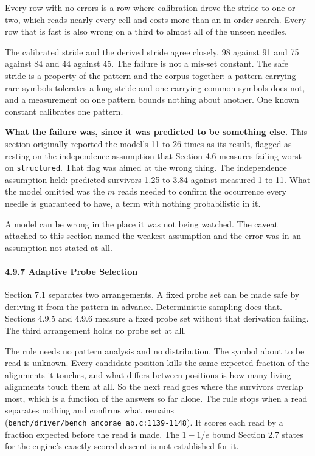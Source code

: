 Every row with no errors is a row where calibration drove the stride to one or two, which reads nearly every cell and costs more than an in-order search. Every row that is fast is also wrong on a third to almost all of the unseen needles.

The calibrated stride and the derived stride agree closely, 98 against 91 and 75 against 84 and 44 against 45. The failure is not a mis-set constant. The safe stride is a property of the pattern and the corpus together: a pattern carrying rare symbols tolerates a long stride and one carrying common symbols does not, and a measurement on one pattern bounds nothing about another. One known constant calibrates one pattern.

\noindent\textbf{What the failure was, since it was predicted to be something else.} This section originally reported the model's 11 to 26 times as its result, flagged as resting on the independence assumption that Section 4.6 measures failing worst on \texttt{structured}. That flag was aimed at the wrong thing. The independence assumption held: predicted survivors 1.25 to 3.84 against measured 1 to 11. What the model omitted was the \(m\) reads needed to confirm the occurrence every needle is guaranteed to have, a term with nothing probabilistic in it.

A model can be wrong in the place it was not being watched. The caveat attached to this section named the weakest assumption and the error was in an assumption not stated at all.

\paragraph{4.9.7 Adaptive Probe Selection}

Section 7.1 separates two arrangements. A fixed probe set can be made safe by deriving it from the pattern in advance. Deterministic sampling does that. Sections 4.9.5 and 4.9.6 measure a fixed probe set without that derivation failing. The third arrangement holds no probe set at all.

The rule needs no pattern analysis and no distribution. The symbol about to be read is unknown. Every candidate position kills the same expected fraction of the alignments it touches, and what differs between positions is how many living alignments touch them at all. So the next read goes where the survivors overlap most, which is a function of the answers so far alone. The rule stops when a read separates nothing and confirms what remains (\texttt{bench/\allowbreak{}driver/\allowbreak{}bench\_\allowbreak{}ancorae\_\allowbreak{}ab.\allowbreak{}c:1139-\allowbreak{}1148}). It scores each read by a fraction expected before the read is made. The \(1 - 1/e\) bound Section 2.7 states for the engine's exactly scored descent is not established for it.

